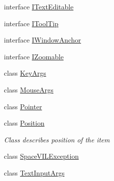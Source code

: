 \begin{DoxyCompactItemize}
\item 
interface \mbox{\hyperlink{interface_space_v_i_l_1_1_core_1_1_i_text_editable}{I\+Text\+Editable}}
\item 
interface \mbox{\hyperlink{interface_space_v_i_l_1_1_core_1_1_i_tool_tip}{I\+Tool\+Tip}}
\item 
interface \mbox{\hyperlink{interface_space_v_i_l_1_1_core_1_1_i_window_anchor}{I\+Window\+Anchor}}
\item 
interface \mbox{\hyperlink{interface_space_v_i_l_1_1_core_1_1_i_zoomable}{I\+Zoomable}}
\item 
class \mbox{\hyperlink{class_space_v_i_l_1_1_core_1_1_key_args}{Key\+Args}}
\item 
class \mbox{\hyperlink{class_space_v_i_l_1_1_core_1_1_mouse_args}{Mouse\+Args}}
\item 
class \mbox{\hyperlink{class_space_v_i_l_1_1_core_1_1_pointer}{Pointer}}
\item 
class \mbox{\hyperlink{class_space_v_i_l_1_1_core_1_1_position}{Position}}
\begin{DoxyCompactList}\small\item\em Class describes position of the item \end{DoxyCompactList}\item 
class \mbox{\hyperlink{class_space_v_i_l_1_1_core_1_1_space_v_i_l_exception}{Space\+V\+I\+L\+Exception}}
\item 
class \mbox{\hyperlink{class_space_v_i_l_1_1_core_1_1_text_input_args}{Text\+Input\+Args}}
\end{DoxyCompactItemize}

